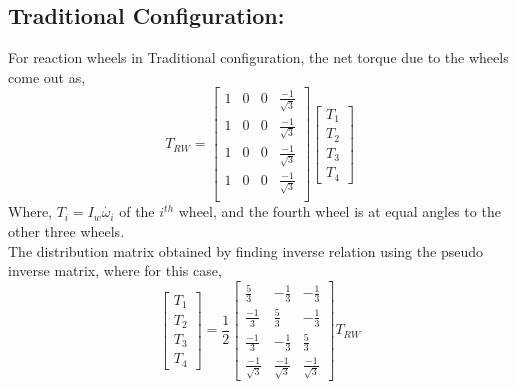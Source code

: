 \documentclass[10pt,a4paper]{report}
\begin{document}
\subsection{Traditional Configuration:}
For reaction wheels in Traditional configuration, the net torque due to the wheels come out as,
\begin{equation}
T_{RW}=\begin{bmatrix}
1& 0 &0 &\frac{-1}{\sqrt{3}}\\
1& 0 &0 &\frac{-1}{\sqrt{3}}\\
1& 0 &0 &\frac{-1}{\sqrt{3}}\\
1& 0 &0 &\frac{-1}{\sqrt{3}}\\
\end{bmatrix}
\begin{bmatrix}
T_{1}\\T_{2}\\T_{3}\\T_{4}
\end{bmatrix}
\end{equation}
Where, $ T_{i}=I_{w}\dot{\omega_{i}} $ of the $ i^{th} $ wheel, and the fourth wheel is at equal angles to the other three wheels.\\

The distribution matrix obtained by finding inverse relation using the pseudo inverse matrix, where for this case,
\begin{equation}
\begin{bmatrix}
T_{1}\\T_{2}\\T_{3}\\T_{4}
\end{bmatrix}
=\frac{1}{2}\begin{bmatrix}
\frac{5}{3} &-\frac{1}{3} &-\frac{1}{3} \\
\frac{-1}{3} &\frac{5}{3} & -\frac{1}{3}\\
\frac{-1}{3} &-\frac{1}{3} &\frac{5}{3} \\
\frac{-1}{\sqrt{3}} &\frac{-1}{\sqrt{3}} &\frac{-1}{\sqrt{3}} 
\end{bmatrix}T_{RW}
\end{equation}

\end{document}
